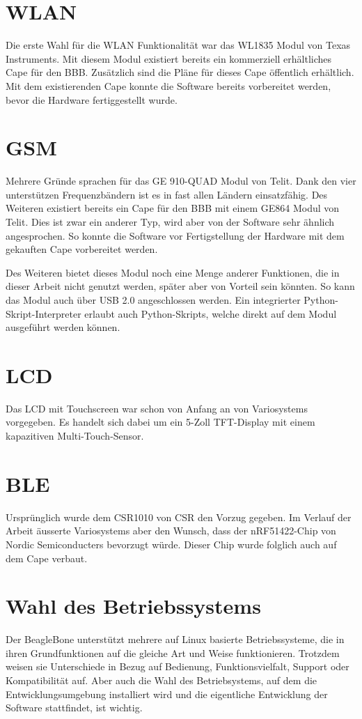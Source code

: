\section{WLAN}
Die erste Wahl für die WLAN Funktionalität war das WL1835 Modul von Texas Instruments. Mit diesem Modul existiert bereits ein kommerziell erhältliches Cape für den BBB. Zusätzlich sind die Pläne für dieses Cape öffentlich erhältlich. Mit dem existierenden Cape konnte die Software bereits vorbereitet werden, bevor die Hardware fertiggestellt wurde.


\section{GSM}
Mehrere Gründe sprachen für das GE 910-QUAD Modul von Telit. Dank den vier unterstützen Frequenzbändern ist es in fast allen Ländern einsatzfähig. Des Weiteren existiert bereits ein Cape für den BBB mit einem GE864 Modul von Telit. Dies ist zwar ein anderer Typ, wird aber von der Software sehr ähnlich angesprochen. So konnte die Software vor Fertigstellung der Hardware mit dem gekauften Cape vorbereitet werden.

Des Weiteren bietet dieses Modul noch eine Menge anderer Funktionen, die in dieser Arbeit nicht genutzt werden, später aber von Vorteil sein könnten. So kann das Modul auch über USB 2.0 angeschlossen werden. Ein integrierter Python-Skript-Interpreter erlaubt auch Python-Skripts, welche direkt auf dem Modul ausgeführt werden können.


\section{LCD}
Das LCD mit Touchscreen war schon von Anfang an von Variosystems vorgegeben. Es handelt sich dabei um ein 5-Zoll TFT-Display mit einem kapazitiven Multi-Touch-Sensor.


\section{BLE}
Ursprünglich wurde dem CSR1010 von CSR den Vorzug gegeben. Im Verlauf der Arbeit äusserte  Variosystems aber den Wunsch, dass der nRF51422-Chip von Nordic Semiconducters bevorzugt würde. Dieser Chip wurde folglich auch auf dem Cape verbaut.


\section{Wahl des Betriebssystems}
Der BeagleBone unterstützt mehrere auf Linux basierte Betriebssysteme, die in ihren Grundfunktionen auf die gleiche Art und Weise funktionieren. Trotzdem weisen sie Unterschiede in Bezug auf Bedienung, Funktionsvielfalt, Support oder Kompatibilität auf.
Aber auch die Wahl des Betriebsystems, auf dem die Entwicklungsumgebung installiert wird und die eigentliche Entwicklung der Software stattfindet, ist wichtig. 


